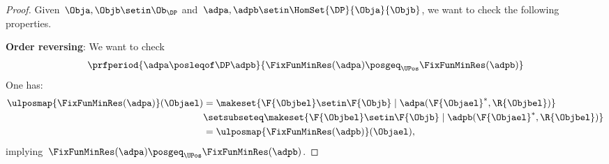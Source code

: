 \begin{proof}
    Given~$\Obja,\Objb \setin \Ob_\DP$ and~$\adpa,\adpb \setin \HomSet{\DP}{\Obja}{\Objb}$, we want to check the following properties.

    \textbf{Order reversing}:
    We want to check
    \begin{equation}
        \prfperiod{\adpa \posleqof\DP \adpb}{\FixFunMinRes(\adpa) \posgeq_\UPos \FixFunMinRes(\adpb)}
    \end{equation}
    One has:
    \begin{equation}
        \begin{aligned}
            \ulposmap{\FixFunMinRes(\adpa)}(\Objael) & =\makeset{\F{\Objbel} \setin \F{\Objb} \mid \adpa(\F{\Objael}^*, \R{\Objbel})} \\
                                                     & \setsubseteq \makeset{\F{\Objbel} \setin \F{\Objb} \mid \adpb(\F{\Objael}^*, \R{\Objbel})} \\
                                                     & = \ulposmap{\FixFunMinRes(\adpb)}(\Objael),
        \end{aligned}
    \end{equation}
    implying~$\FixFunMinRes(\adpa) \posgeq_\UPos \FixFunMinRes(\adpb)$.


\end{proof}

